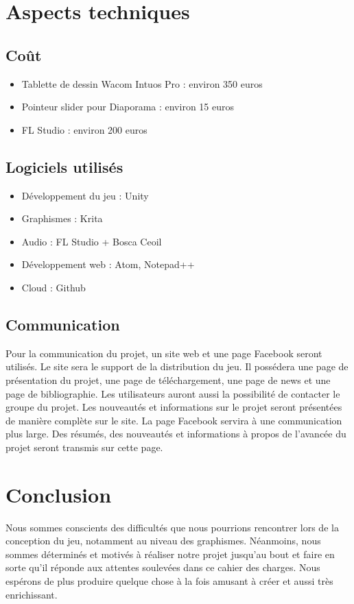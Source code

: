 \documentclass[]{extarticle}
\begin{document}
\section{Aspects techniques}
	\subsection{Coût}
\bigbreak
\bigbreak
\begin{itemize}
\item Tablette de dessin Wacom Intuos Pro : environ 350 euros
\item Pointeur slider pour Diaporama : environ 15 euros
\item FL Studio : environ 200 euros
\end{itemize}

\bigbreak
	\subsection{Logiciels utilisés}
\bigbreak
\bigbreak
\begin{itemize}
\item Développement du jeu : Unity
\item Graphismes : Krita
\item Audio : FL Studio + Bosca Ceoil
\item Développement web : Atom, Notepad++
\item Cloud : Github
\end{itemize}
\bigbreak

	\subsection{Communication}
\bigbreak
\bigbreak
Pour la communication du projet, un site web et une page Facebook seront utilisés.
\bigbreak
Le site sera le support de la distribution du jeu. Il possédera une page de présentation du projet, une page de téléchargement, une page de news et une page de bibliographie. Les utilisateurs auront aussi la possibilité de contacter le groupe du projet. Les nouveautés et informations sur le projet seront présentées de manière complète sur le site.
\bigbreak
La page Facebook servira à une communication plus large. Des résumés, des nouveautés et informations à propos de l’avancée du projet seront transmis sur cette page.
\bigbreak

\section{Conclusion}
\bigbreak
\bigbreak
Nous sommes conscients des difficultés que nous pourrions rencontrer lors de la conception du jeu, notamment au niveau des graphismes. Néanmoins, nous sommes déterminés et motivés à réaliser notre projet jusqu'au bout et faire en sorte qu'il réponde aux attentes soulevées dans ce cahier des charges. Nous espérons de plus produire quelque chose à la fois amusant à créer et aussi très enrichissant.
\end{document}
